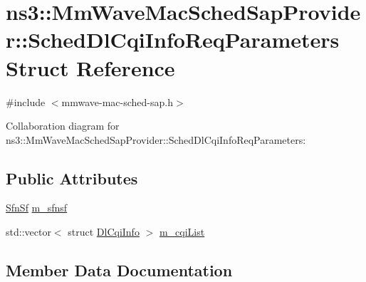 \hypertarget{structns3_1_1MmWaveMacSchedSapProvider_1_1SchedDlCqiInfoReqParameters}{}\section{ns3\+:\+:Mm\+Wave\+Mac\+Sched\+Sap\+Provider\+:\+:Sched\+Dl\+Cqi\+Info\+Req\+Parameters Struct Reference}
\label{structns3_1_1MmWaveMacSchedSapProvider_1_1SchedDlCqiInfoReqParameters}


{\ttfamily \#include $<$mmwave-\/mac-\/sched-\/sap.\+h$>$}



Collaboration diagram for ns3\+:\+:Mm\+Wave\+Mac\+Sched\+Sap\+Provider\+:\+:Sched\+Dl\+Cqi\+Info\+Req\+Parameters\+:
\subsection*{Public Attributes}
\begin{DoxyCompactItemize}
\item 
\hyperlink{structns3_1_1SfnSf}{Sfn\+Sf} \hyperlink{structns3_1_1MmWaveMacSchedSapProvider_1_1SchedDlCqiInfoReqParameters_a38045fb933c29fcd19d9ad164250ee31}{m\+\_\+sfnsf}
\item 
std\+::vector$<$ struct \hyperlink{structns3_1_1DlCqiInfo}{Dl\+Cqi\+Info} $>$ \hyperlink{structns3_1_1MmWaveMacSchedSapProvider_1_1SchedDlCqiInfoReqParameters_a5372c7a49941c7834e7c01153ed97e19}{m\+\_\+cqi\+List}
\end{DoxyCompactItemize}


\subsection{Member Data Documentation}
